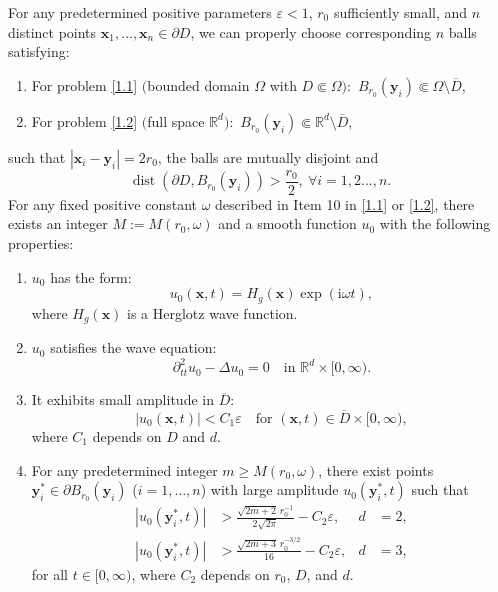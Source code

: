 \documentclass[10pt,a4paper]{amsart}
\begin{document}
	\begin{theorem}\label{thm:main_result}
		For any predetermined positive parameters $\varepsilon < 1$, $r_0$ sufficiently small, and $n$ distinct points $\mathbf{x}_1,\dots,\mathbf{x}_n \in \partial D$, we can properly choose corresponding $n$ balls satisfying:
		\begin{enumerate}
			\renewcommand{\labelenumi}{(\roman{enumi})}
			\item For problem \eqref{1.1} $($bounded domain $\Omega$ with $D \Subset \Omega):$ $B_{r_0}(\mathbf{y}_i) \Subset \Omega \setminus \overline{D}$,
			\item For problem \eqref{1.2} $($full space $\mathbb{R}^d ):$ $B_{r_0}(\mathbf{y}_i) \Subset \mathbb{R}^d \setminus \overline{D}$,
		\end{enumerate}
		such that $|\mathbf{x}_i - \mathbf{y}_i| = 2r_0$, the balls are mutually disjoint and
		$$
		\operatorname{dist}(\partial D, B_{r_0}(\mathbf{y}_i))>\frac{r_0}{2},\ \forall i=1,2...,n.
		$$
		For any fixed positive constant $\omega$ described in Item 10 in \eqref{1.1} or \eqref{1.2},  there exists an integer $M := M(r_0,\omega)$ and a smooth function $u_0$ with the following properties:
		\begin{enumerate}
			\item $u_0$ has the form$:$
			\begin{equation*}
				u_0(\mathbf{x},t) = H_g(\mathbf{x})\exp(\mathrm{i}\omega t),
			\end{equation*}
			where $ H_g(\mathbf{x})$ is a Herglotz wave function. 
			
			\item $u_0$ satisfies the wave equation$:$
			\[
			\partial_{tt}^2 u_0 - \Delta u_0 = 0 \quad \text{in } \mathbb{R}^d \times [0,\infty).
			\]
			
			\item It exhibits small amplitude in $\overline{D}:$
			\begin{equation}\label{u0 smalles}
				|u_0(\mathbf{x},t)| < C_1\varepsilon \quad \text{for } (\mathbf{x},t) \in \overline{D} \times [0,\infty),
			\end{equation}
			where $C_1$ depends on $D$ and $d$.
			
			\item For any predetermined integer $m \geqslant M(r_0,\omega)$, there exist points $\mathbf{y}^*_i \in \partial B_{r_0}(\mathbf{y}_i)$  ($i=1,\dots,n$) with large amplitude $u_0(\mathbf{y}^*_i,t)$ such that
			\begin{align}
				|u_0(\mathbf{y}^*_i,t)| &> \frac{\sqrt{2m+2}\,r_0^{-1}}{2\sqrt{2\pi}} - C_2\varepsilon, & d &= 2, \label{2 d} \\
				|u_0(\mathbf{y}^*_i,t)| &> \frac{\sqrt{2m+3}\,r_0^{-3/2}}{16} - C_2\varepsilon, & d &= 3, \label{3 d}
			\end{align}
			for all $t \in [0,\infty)$, where $C_2$ depends on $r_0$, $D$, and $d$.
		\end{enumerate}
	\end{theorem}
\end{document}
